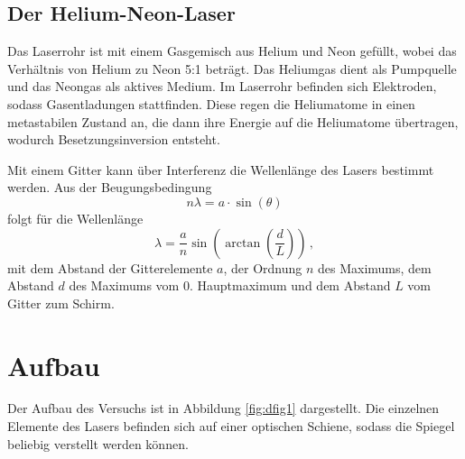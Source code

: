 \subsection*{Der Helium-Neon-Laser}
Das Laserrohr ist mit einem Gasgemisch aus Helium und Neon gefüllt, wobei das Verhältnis von Helium zu Neon 5:1 beträgt.
Das Heliumgas dient als Pumpquelle und das Neongas als aktives Medium. Im Laserrohr befinden sich Elektroden, sodass 
Gasentladungen stattfinden. Diese regen die Heliumatome in einen metastabilen Zustand an, die dann ihre Energie auf 
die Heliumatome übertragen, wodurch Besetzungsinversion entsteht.

Mit einem Gitter kann über Interferenz die Wellenlänge des Lasers bestimmt werden. Aus der Beugungsbedingung 
\begin{equation*}
    n \lambda = a \cdot \sin \left(\theta \right)
\end{equation*}
folgt für die Wellenlänge
\begin{equation}
    \label{eq:Wellenlänge}
    \lambda = \frac{a}{n}  \sin \left(\arctan \left(\frac{d}{L}\right)\right)     \, ,
\end{equation}
mit dem Abstand der Gitterelemente $a$, der Ordnung $n$ des Maximums, dem Abstand $d$ des Maximums vom 0. Hauptmaximum
und dem Abstand $L$ vom Gitter zum Schirm.

\section{Aufbau}
Der Aufbau des Versuchs ist in Abbildung \ref{fig:dfig1} dargestellt. Die einzelnen Elemente des Lasers befinden sich 
auf einer optischen Schiene, sodass die Spiegel beliebig verstellt werden können. 

